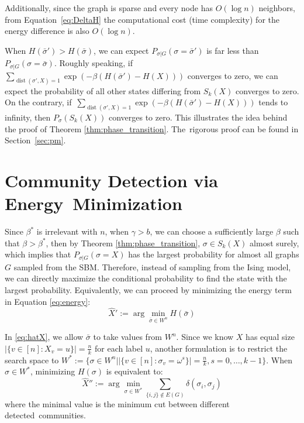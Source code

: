 \documentclass[entropy,article,accept,moreauthors,pdftex]{Definitions/mdpi}
\newcommand{\1}{\mathbbm{1}}
\DeclareMathOperator{\Dist}{dist}
\begin{document}
\begin{paracol}{2}
Additionally, since the graph is sparse and every node has $O(\log n)$ neighbors, from Equation~\eqref{eq:DeltaH} the computational cost (time complexity) for the energy difference
is also $O(\log n)$. 

When $H(\bar{\sigma}') > H(\bar{\sigma})$, we can expect $P_{\sigma | G}(\sigma = \bar{\sigma}')$ is far less than 
$P_{\sigma | G}(\sigma = \bar{\sigma})$.
Roughly speaking, if~ $ \sum_{\Dist(\sigma', X)=1}\exp(-\beta(H(\bar{\sigma}') - H(X))) $ converges to zero,
we can expect the probability of all other states differing from $S_k(X)$ converges to zero.
On the contrary, if~$ \sum_{\Dist(\sigma', X)=1}\exp(-\beta(H(\bar{\sigma}') - H(X))) $ tends to infinity,
then  $P_{\sigma}(S_k(X))$ converges to zero. This illustrates the idea behind
the proof of
Theorem \ref{thm:phase_transition}. The~rigorous proof can be found in Section~\ref{sec:pm}.


\section{Community Detection via Energy~Minimization}\label{sec:em}
Since $\beta^*$ is irrelevant with $n$, when $\gamma>b$, we can choose a sufficiently large $\beta$ such that
$\beta > \beta^*$, then by Theorem \ref{thm:phase_transition}, $\sigma \in S_k(X)$ almost surely, which
implies that $P_{\sigma | G}(\sigma = X)$ has the largest probability for almost all graphs $G$ sampled from the SBM. Therefore, instead of
sampling from the Ising model, we can directly maximize the conditional probability to find the state with the largest probability.
Equivalently, we can proceed by minimizing the energy term in Equation \eqref{eq:energy}:
\begin{equation}\label{eq:hatX}
\hat{X}' := \arg\min_{\bar{\sigma} \in W^n} H(\bar{\sigma})
\end{equation}

In \eqref{eq:hatX}, we allow $\bar{\sigma}$ to take values from $W^n$. Since we know $X$ has equal
size\linebreak $|\{v \in [n] : X_v = u\}| = \frac{n}{k}$ for each label $u$, another formulation is to restrict the search space to
$W^*:= \{\sigma\in W^n \big\vert |\{v \in [n] : \sigma_v = \omega^s\}| = \frac{n}{k}, s=0,\dots, k-1 \}$.
When $\sigma \in W^*$, minimizing $H(\sigma)$ is equivalent to:
\begin{equation}
\hat{X}'' := \arg\min_{\sigma \in W^*} \sum_{\{i,j\} \not\in E(G) } \delta(\sigma_i, \sigma_j)
\end{equation}
where the minimal value is the minimum cut between different detected~communities.


\end{paracol}
\end{document}
